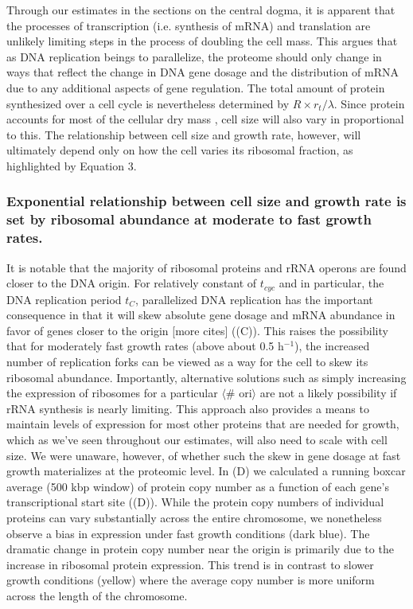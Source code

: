 Through our estimates in the sections on the central dogma, it is
apparent that the processes of transcription (i.e. synthesis of mRNA) and
translation are unlikely limiting steps in the process of doubling the
cell mass. This argues that as DNA replication beings to parallelize, the
proteome should only change in ways that reflect the change in DNA gene dosage
and the distribution of mRNA due to any additional aspects of gene regulation.
The total amount of protein synthesized over a cell cycle is nevertheless
determined by $R \times r_t / \lambda$. Since protein accounts for most of
the cellular dry mass \citep{bremer2008, basan2015}, cell size will also vary
in proportional to this. The relationship between cell size and growth rate,
however, will ultimately depend only on how the cell varies its ribosomal
fraction, as highlighted by Equation 3.

\subsubsection{Exponential relationship between cell size and growth rate is
set by ribosomal abundance at moderate to fast growth rates.}

It is notable that the majority of ribosomal proteins and rRNA operons are found
closer to the DNA origin. For relatively constant of $t_{cyc}$ and in
particular, the DNA replication  period $t_C$, parallelized DNA replication has
the important consequence in that it will skew absolute gene dosage and mRNA
abundance in favor of genes closer to the origin \citep{scholz2019} [more cites]
((C)). This raises the possibility that for
moderately fast growth rates (above about 0.5 h$^{-1}$), the increased number of
replication forks can be viewed as a way for the cell to skew its ribosomal
abundance. Importantly, alternative solutions such as simply increasing the
expression of ribosomes for a particular $\langle$\# ori$\rangle$ are not a
likely possibility if rRNA synthesis is nearly limiting. This approach also
provides a means to maintain levels of expression for most other proteins that
are needed  for growth, which as we've seen throughout our estimates, will also
need to scale with cell size. We were unaware, however, of whether such the skew
in  gene dosage at fast growth materializes at the proteomic level. In
(D) we calculated a running boxcar average (500 kbp
window) of protein copy number as a function of each gene's transcriptional
start site ((D)). While the protein copy numbers of
individual proteins can vary substantially across the entire chromosome, we
nonetheless observe a bias in expression under fast growth conditions (dark
blue). The dramatic change in protein copy number near the origin is primarily
due to the increase in ribosomal protein expression. This trend is in contrast
to slower growth conditions (yellow) where the average copy number is more
uniform across the length of the chromosome.

